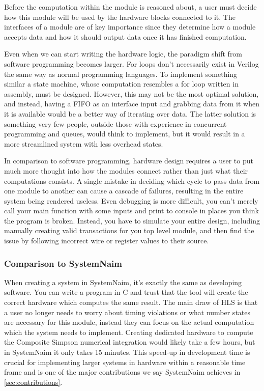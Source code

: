 Before the computation within the module is reasoned about, a user must decide how this module will be used by the hardware blocks connected to it. The interfaces of a module are of key importance since they determine how a module accepts data and how it should output data once it has finished computation.

Even when we can start writing the hardware logic, the paradigm shift from software programming becomes larger. For loops don't necessarily exist in Verilog the same way as normal programming languages. To implement something similar a state machine, whose computation resembles a for loop written in assembly, must be designed. However, this may not be the most optimal solution, and instead, having a FIFO as an interface input and grabbing data from it when it is available would be a better way of iterating over data. The latter solution is something very few people, outside those with experience in concurrent programming and queues, would think to implement, but it would result in a more streamlined system with less overhead states.

In comparison to software programming, hardware design requires a user to put much more thought into how the modules connect rather than just what their computations consists. A single mistake in deciding which cycle to pass data from one module to another can cause a cascade of failures, resulting in the entire system being rendered useless. Even debugging is more difficult, you can't merely call your main function with some inputs and print to console in places you think the program is broken. Instead, you have to simulate your entire design, including manually creating valid transactions for you top level module, and then find the issue by following incorrect wire or register values to their source.

\subsubsection{Comparison to SystemNaim}

When creating a system in SystemNaim, it's exactly the same as developing software. You can write a program in C and trust that the tool will create the correct hardware which computes the same result. The main draw of HLS is that a user no longer needs to worry about timing violations or what number states are necessary for this module, instead they can focus on the actual computation which the system needs to implement. Creating dedicated hardware to compute the Composite Simpson numerical integration would likely take a few hours, but in SystemNaim it only takes 15 minutes. This speed-up in development time is crucial for implementing larger systems in hardware within a reasonable time frame and is one of the major contributions we say SystemNaim achieves in \autoref{sec:contributions}.

